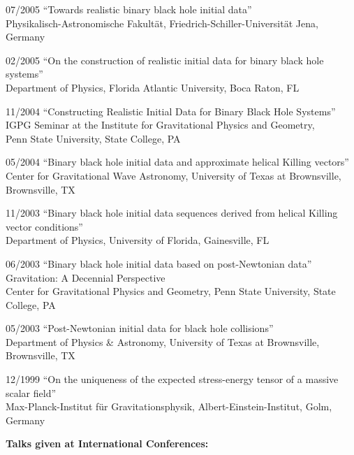 \documentclass[11pt]{article}
\begin{document}
\begin{list}{}{\leftmargin=5em =1.5em \rightmargin=-8em =7em}
\item[07/2005]	``Towards realistic binary black hole initial data''\\
		{Physikalisch-Astronomische Fakult\"at},
		{Friedrich-Schiller-Universit\"at Jena, Germany}
\item[02/2005]	``On the construction of realistic initial data 
		    for binary black hole systems''\\
		{Department of Physics},
		{Florida Atlantic University, Boca Raton, FL}
\item[11/2004]	``Constructing Realistic Initial Data for 
                    Binary Black Hole Systems''\\
		{IGPG Seminar at the Institute for Gravitational
		       Physics and Geometry},\\
		{Penn State University, State College, PA}
\item[05/2004]	``Binary black hole initial data and approximate 
		    helical Killing vectors''\\
		{Center for Gravitational Wave Astronomy},
		{University of Texas at Brownsville, Brownsville, TX}
\item[11/2003]	``Binary black hole initial data sequences
		    derived from helical Killing vector conditions''\\
		{Department of Physics},
		{University of Florida, Gainesville, FL}
\item[06/2003]	``Binary black hole initial data based 
		    on post-Newtonian data'' \\
		{Gravitation: A Decennial Perspective}\\
		{Center for Gravitational Physics and Geometry},
		{Penn State University, State College, PA}
\item[05/2003]	``Post-Newtonian initial data for black hole collisions'' \\
		{Department of Physics \& Astronomy},
		{University of Texas at Brownsville, Brownsville, TX}
\item[12/1999]	``On the uniqueness of the expected stress-energy tensor
		    of a massive scalar field''\\
		{Max-Planck-Institut f\"ur Gravitationsphysik},
		{Albert-Einstein-Institut, Golm, Germany}\\
\end{list}


\medskip

{\bf Talks given at International Conferences:}
\end{document}

